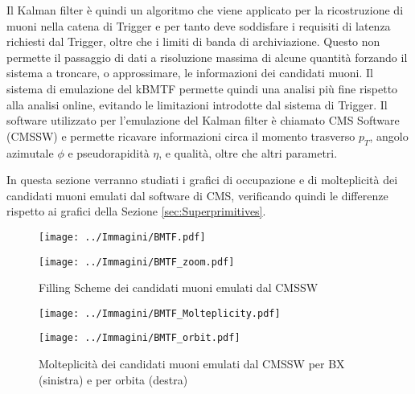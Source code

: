 Il Kalman filter è quindi un algoritmo che viene applicato per la ricostruzione di muoni nella catena di Trigger e per tanto deve soddisfare i requisiti di latenza richiesti dal Trigger, oltre che i limiti di banda di archiviazione. Questo non permette il passaggio di dati a risoluzione massima di alcune quantità forzando il sistema a troncare, o approssimare, le informazioni dei candidati muoni. Il sistema di emulazione del kBMTF permette quindi una analisi più fine rispetto alla analisi online, evitando le limitazioni introdotte dal sistema di Trigger. Il software utilizzato per l'emulazione del Kalman filter è chiamato CMS Software (CMSSW) e permette ricavare informazioni circa il momento trasverso $p_T$, angolo azimutale $\phi$ e pseudorapidità $\eta$, e qualità, oltre che altri parametri.

In questa sezione verranno studiati i grafici di occupazione e di molteplicità dei candidati muoni emulati dal software di CMS, verificando quindi le differenze rispetto ai grafici della Sezione \ref{sec:Superprimitives}.



\begin{figure}[t]
  \centering
  \begin{minipage}[b]{0.49\textwidth}
      \centering
      \texttt{[image: ../Immagini/BMTF.pdf]} 
    \end{minipage}
    \hfill 
    \begin{minipage}[b]{0.49\textwidth}
      \centering
      \texttt{[image: ../Immagini/BMTF\_zoom.pdf]} 
    \end{minipage}
    \caption{Filling Scheme dei candidati muoni emulati dal CMSSW}
  \label{fig:BMTFMuons}
\end{figure}

\begin{figure}[b]
  \centering
  \begin{minipage}[b]{0.49\textwidth}
      \centering
      \texttt{[image: ../Immagini/BMTF\_Molteplicity.pdf]} 
    \end{minipage}
    \hfill 
    \begin{minipage}[b]{0.49\textwidth}
      \centering
      \texttt{[image: ../Immagini/BMTF\_orbit.pdf]} 
    \end{minipage}
    \caption{Molteplicità dei candidati muoni emulati dal CMSSW per BX (sinistra) e per orbita (destra)}
  \label{fig:BMTFMolteplicity}
\end{figure}

